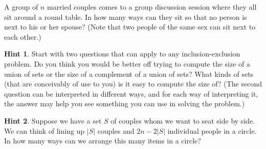 \documentclass{book}
\begin{document}
\setcounter{cpjt}{226}
\addtocounter{cpjt}{-1}
\begin{activity}\label{relaxedmenage}
\hypertarget{p-1208}{}%
A group of \(n\) married couples comes to a group discussion session where they all sit around a round table. In how many ways can they sit so that no person is next to his or her spouse? (Note that two people of the same sex can sit next to each other.)%
\par\smallskip%
\noindent\textbf{Hint 1}.\hypertarget{hint-146}{}\quad%
\hypertarget{p-1209}{}%
Start with two questions that can apply to any inclusion-exclusion problem. Do you think you would be better off trying to compute the size of a union of sets or the size of a complement of a union of sets? What kinds of sets (that are conceivably of use to you) is it easy to compute the size of? (The second question can be interpreted in different ways, and for each way of interpreting it, the answer may help you see something you can use in solving the problem.)%
\par\smallskip%
\noindent\textbf{Hint 2}.\hypertarget{hint-147}{}\quad%
\hypertarget{p-1210}{}%
Suppose we have a set \(S\) of couples whom we want to seat side by side. We can think of lining up \(|S|\) couples and \(2n - 2|S|\) individual people in a circle.  In how many ways can we arrange this many items in a circle?%
\par\smallskip%
\noindent\end{activity}

\clearpage
\end{document}
